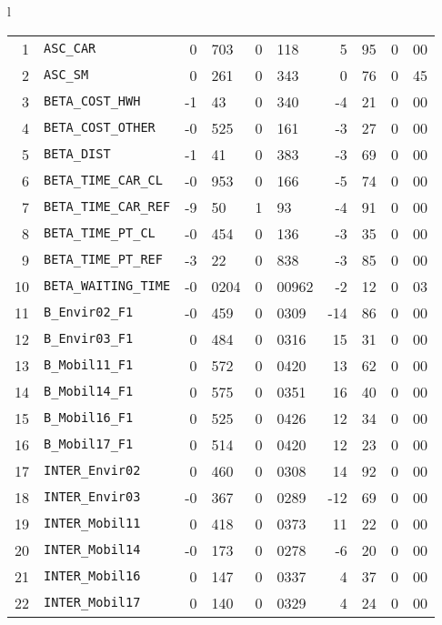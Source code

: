 \documentclass[12pt,a4paper]{article}
\begin{document}
\begin{table}[htb]
\begin{tabular}{l}
\begin{tabular}{rlr@{.}lr@{.}lr@{.}lr@{.}l}
1 & \lstinline$ASC_CAR$ & 0&703 & 0&118 & 5&95 & 0&00\\
2 & \lstinline$ASC_SM$ & 0&261 & 0&343 & 0&76 & 0&45\\
3 & \lstinline$BETA_COST_HWH$ & -1&43 & 0&340 & -4&21 & 0&00\\
4 & \lstinline$BETA_COST_OTHER$ & -0&525 & 0&161 & -3&27 & 0&00\\
5 & \lstinline$BETA_DIST$ & -1&41 & 0&383 & -3&69 & 0&00\\
6 & \lstinline$BETA_TIME_CAR_CL$ & -0&953 & 0&166 & -5&74 & 0&00\\
7 & \lstinline$BETA_TIME_CAR_REF$ & -9&50 & 1&93 & -4&91 & 0&00\\
8 & \lstinline$BETA_TIME_PT_CL$ & -0&454 & 0&136 & -3&35 & 0&00\\
9 & \lstinline$BETA_TIME_PT_REF$ & -3&22 & 0&838 & -3&85 & 0&00\\
10 & \lstinline$BETA_WAITING_TIME$ & -0&0204 & 0&00962 & -2&12 & 0&03\\
11 & \lstinline$B_Envir02_F1$ & -0&459 & 0&0309 & -14&86 & 0&00\\
12 & \lstinline$B_Envir03_F1$ & 0&484 & 0&0316 & 15&31 & 0&00\\
13 & \lstinline$B_Mobil11_F1$ & 0&572 & 0&0420 & 13&62 & 0&00\\
14 & \lstinline$B_Mobil14_F1$ & 0&575 & 0&0351 & 16&40 & 0&00\\
15 & \lstinline$B_Mobil16_F1$ & 0&525 & 0&0426 & 12&34 & 0&00\\
16 & \lstinline$B_Mobil17_F1$ & 0&514 & 0&0420 & 12&23 & 0&00\\
17 & \lstinline$INTER_Envir02$ & 0&460 & 0&0308 & 14&92 & 0&00\\
18 & \lstinline$INTER_Envir03$ & -0&367 & 0&0289 & -12&69 & 0&00\\
19 & \lstinline$INTER_Mobil11$ & 0&418 & 0&0373 & 11&22 & 0&00\\
20 & \lstinline$INTER_Mobil14$ & -0&173 & 0&0278 & -6&20 & 0&00\\
21 & \lstinline$INTER_Mobil16$ & 0&147 & 0&0337 & 4&37 & 0&00\\
22 & \lstinline$INTER_Mobil17$ & 0&140 & 0&0329 & 4&24 & 0&00\\
\end{tabular}
  \end{tabular}
 \end{table}
\end{document}
